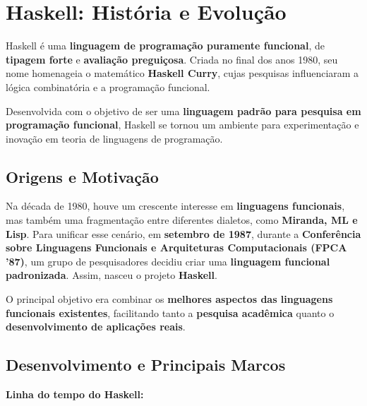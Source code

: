 \section{Haskell: História e Evolução}

Haskell é uma \textbf{linguagem de programação puramente funcional}, de \textbf{tipagem forte} e \textbf{avaliação preguiçosa}. Criada no final dos anos 1980, seu nome homenageia o matemático \textbf{Haskell Curry}, cujas pesquisas influenciaram a lógica combinatória e a programação funcional.

Desenvolvida com o objetivo de ser uma \textbf{linguagem padrão para pesquisa em programação funcional}, Haskell se tornou um ambiente para experimentação e inovação em teoria de linguagens de programação.

\subsection{Origens e Motivação}

Na década de 1980, houve um crescente interesse em \textbf{linguagens funcionais}, mas também uma fragmentação entre diferentes dialetos, como \textbf{Miranda, ML e Lisp}. Para unificar esse cenário, em \textbf{setembro de 1987}, durante a \textbf{Conferência sobre Linguagens Funcionais e Arquiteturas Computacionais (FPCA '87)}, um grupo de pesquisadores decidiu criar uma \textbf{linguagem funcional padronizada}. Assim, nasceu o projeto \textbf{Haskell}.

O principal objetivo era combinar os \textbf{melhores aspectos das linguagens funcionais existentes}, facilitando tanto a \textbf{pesquisa acadêmica} quanto o \textbf{desenvolvimento de aplicações reais}.

\subsection{Desenvolvimento e Principais Marcos}

\textbf{Linha do tempo do Haskell:}


